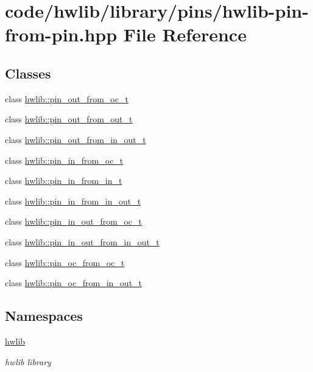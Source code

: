 \hypertarget{hwlib-pin-from-pin_8hpp}{}\section{code/hwlib/library/pins/hwlib-\/pin-\/from-\/pin.hpp File Reference}
\label{hwlib-pin-from-pin_8hpp}
\subsection*{Classes}
\begin{DoxyCompactItemize}
\item 
class \hyperlink{classhwlib_1_1pin__out__from__oc__t}{hwlib\+::pin\+\_\+out\+\_\+from\+\_\+oc\+\_\+t}
\item 
class \hyperlink{classhwlib_1_1pin__out__from__out__t}{hwlib\+::pin\+\_\+out\+\_\+from\+\_\+out\+\_\+t}
\item 
class \hyperlink{classhwlib_1_1pin__out__from__in__out__t}{hwlib\+::pin\+\_\+out\+\_\+from\+\_\+in\+\_\+out\+\_\+t}
\item 
class \hyperlink{classhwlib_1_1pin__in__from__oc__t}{hwlib\+::pin\+\_\+in\+\_\+from\+\_\+oc\+\_\+t}
\item 
class \hyperlink{classhwlib_1_1pin__in__from__in__t}{hwlib\+::pin\+\_\+in\+\_\+from\+\_\+in\+\_\+t}
\item 
class \hyperlink{classhwlib_1_1pin__in__from__in__out__t}{hwlib\+::pin\+\_\+in\+\_\+from\+\_\+in\+\_\+out\+\_\+t}
\item 
class \hyperlink{classhwlib_1_1pin__in__out__from__oc__t}{hwlib\+::pin\+\_\+in\+\_\+out\+\_\+from\+\_\+oc\+\_\+t}
\item 
class \hyperlink{classhwlib_1_1pin__in__out__from__in__out__t}{hwlib\+::pin\+\_\+in\+\_\+out\+\_\+from\+\_\+in\+\_\+out\+\_\+t}
\item 
class \hyperlink{classhwlib_1_1pin__oc__from__oc__t}{hwlib\+::pin\+\_\+oc\+\_\+from\+\_\+oc\+\_\+t}
\item 
class \hyperlink{classhwlib_1_1pin__oc__from__in__out__t}{hwlib\+::pin\+\_\+oc\+\_\+from\+\_\+in\+\_\+out\+\_\+t}
\end{DoxyCompactItemize}
\subsection*{Namespaces}
\begin{DoxyCompactItemize}
\item 
 \hyperlink{namespacehwlib}{hwlib}
\begin{DoxyCompactList}\small\item\em hwlib library \end{DoxyCompactList}\end{DoxyCompactItemize}
